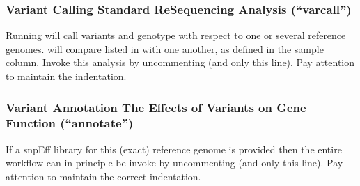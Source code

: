 \documentclass[letterpaper,10pt,english]{sphinxhowto}
\begin{document}
\subsubsection{Variant Calling \sphinxhyphen{} Standard Re\sphinxhyphen{}Sequencing Analysis (“varcall”)}
\label{\detokenize{index:id7}}
Running  will call variants and genotype  with respect to one or several reference genomes.  will compare  listed in  with one another, as defined in the sample column. Invoke this analysis by uncommenting  (and only this line). Pay attention to maintain the indentation.

\begin{sphinxVerbatim}[commandchars=\\\{\}]
 
\end{sphinxVerbatim}


\subsubsection{Variant Annotation \sphinxhyphen{} The Effects of Variants on Gene Function (“annotate”)}
\label{\detokenize{index:id8}}
If a snpEff library for this (exact) reference genome is provided then the entire workflow can in principle be invoke by uncommenting  (and only this line). Pay attention to maintain the correct indentation.

\begin{sphinxVerbatim}[commandchars=\\\{\}]
 
\end{sphinxVerbatim}
\end{document}
